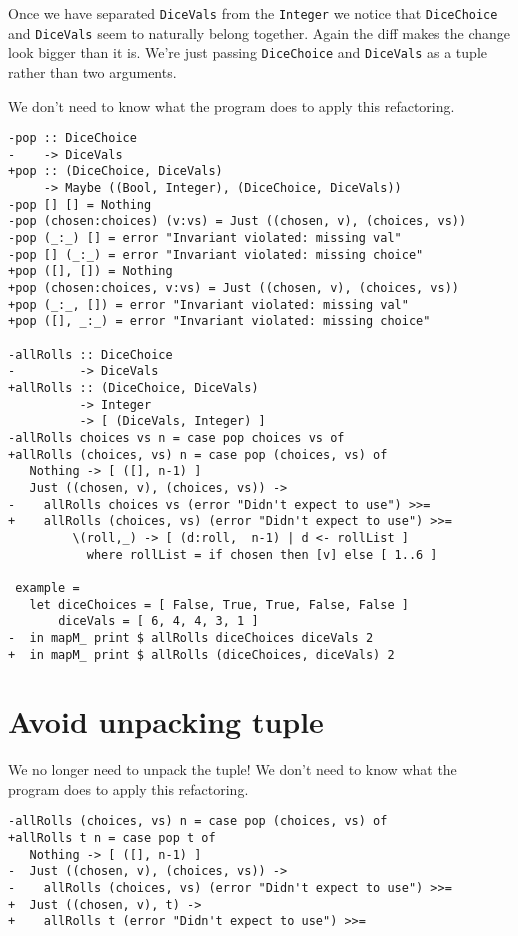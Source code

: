 Once we have separated \texttt{DiceVals} from the \texttt{Integer} we notice that \texttt{DiceChoice} and \texttt{DiceVals} seem to naturally belong together. Again the diff makes the change look bigger than it is. We're just passing \texttt{DiceChoice} and \texttt{DiceVals} as a tuple rather than two arguments.

We don't need to know what the program does to apply this refactoring.

\begin{verbatim}
-pop :: DiceChoice
-    -> DiceVals
+pop :: (DiceChoice, DiceVals)
     -> Maybe ((Bool, Integer), (DiceChoice, DiceVals))
-pop [] [] = Nothing
-pop (chosen:choices) (v:vs) = Just ((chosen, v), (choices, vs))
-pop (_:_) [] = error "Invariant violated: missing val"
-pop [] (_:_) = error "Invariant violated: missing choice"
+pop ([], []) = Nothing
+pop (chosen:choices, v:vs) = Just ((chosen, v), (choices, vs))
+pop (_:_, []) = error "Invariant violated: missing val"
+pop ([], _:_) = error "Invariant violated: missing choice"

-allRolls :: DiceChoice
-         -> DiceVals
+allRolls :: (DiceChoice, DiceVals)
          -> Integer
          -> [ (DiceVals, Integer) ]
-allRolls choices vs n = case pop choices vs of
+allRolls (choices, vs) n = case pop (choices, vs) of
   Nothing -> [ ([], n-1) ]
   Just ((chosen, v), (choices, vs)) ->
-    allRolls choices vs (error "Didn't expect to use") >>=
+    allRolls (choices, vs) (error "Didn't expect to use") >>=
         \(roll,_) -> [ (d:roll,  n-1) | d <- rollList ]
           where rollList = if chosen then [v] else [ 1..6 ]

 example =
   let diceChoices = [ False, True, True, False, False ]
       diceVals = [ 6, 4, 4, 3, 1 ]
-  in mapM_ print $ allRolls diceChoices diceVals 2
+  in mapM_ print $ allRolls (diceChoices, diceVals) 2
\end{verbatim}

\section{Avoid unpacking tuple}


We no longer need to unpack the tuple! We don't need to know what the program does to apply this refactoring.

\begin{verbatim}
-allRolls (choices, vs) n = case pop (choices, vs) of
+allRolls t n = case pop t of
   Nothing -> [ ([], n-1) ]
-  Just ((chosen, v), (choices, vs)) ->
-    allRolls (choices, vs) (error "Didn't expect to use") >>=
+  Just ((chosen, v), t) ->
+    allRolls t (error "Didn't expect to use") >>=
\end{verbatim}


